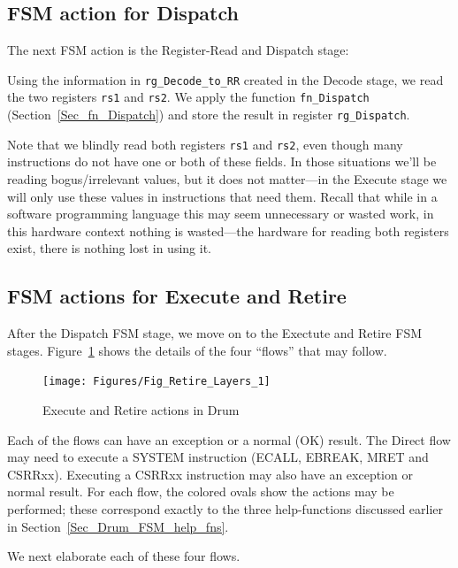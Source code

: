 \subsection{FSM action for Dispatch}

The next FSM action is the Register-Read and Dispatch stage:


Using the information in \verb|rg_Decode_to_RR| created in the Decode
stage, we read the two registers \verb|rs1| and \verb|rs2|.  We apply
the function \verb|fn_Dispatch| (Section~\ref{Sec_fn_Dispatch}) and
store the result in register \verb|rg_Dispatch|.

Note that we blindly read both registers \verb|rs1| and \verb|rs2|,
even though many instructions do not have one or both of these fields.
In those situations we'll be reading bogus/irrelevant values, but it
does not matter---in the Execute stage we will only use these values
in instructions that need them. Recall that while in a software
programming language this may seem unnecessary or wasted work, in this
hardware context nothing is wasted---the hardware for reading both
registers exist, there is nothing lost in using it.


\subsection{FSM actions for Execute and Retire}

After the Dispatch FSM stage, we move on to the Exectute and Retire
FSM stages.  Figure~\ref{Fig_Retire_Drum} shows the details of the
four ``flows'' that may follow.
\begin{figure}[htbp]
  \centerline{\texttt{[image: Figures/Fig\_Retire\_Layers\_1]}}
  \caption{\label{Fig_Retire_Drum}Execute and Retire actions in Drum}
\end{figure}
Each of the flows can have an exception or a normal (OK) result.  The
Direct flow may need to execute a SYSTEM instruction (ECALL, EBREAK,
MRET and CSRRxx).  Executing a CSRRxx instruction may also have an
exception or normal result.  For each flow, the colored ovals show the
actions may be performed; these correspond exactly to the three
help-functions discussed earlier in Section~\ref{Sec_Drum_FSM_help_fns}.

We next elaborate each of these four flows.

